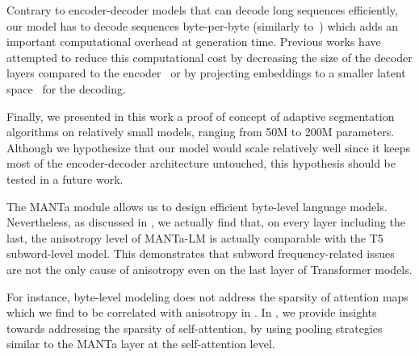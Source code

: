 Contrary to encoder-decoder models that can decode long sequences efficiently, our model has to decode sequences byte-per-byte (similarly to~\citet{clark2022canine,xue2022byt5,tay2021charformer}) which adds an important computational overhead at generation time. Previous works have attempted to reduce this computational cost by decreasing the size of the decoder layers compared to the encoder~\cite{xue2022byt5} or by projecting embeddings to a smaller latent space~\cite{jaegle2021perceiver} for the decoding.

Finally, we presented in this work a proof of concept of adaptive segmentation algorithms on relatively small models, ranging from 50M to 200M parameters. Although we hypothesize that our model would scale relatively well since it keeps most of the encoder-decoder architecture untouched, this hypothesis should be tested in a future work.


\vspace{2em}

The MANTa module allows us to design efficient byte-level language models. Nevertheless, as discussed in , we actually find that, on every layer including the last, the anisotropy level of MANTa-LM is actually comparable with the T5 subword-level model. This demonstrates that subword frequency-related issues are not the only cause of anisotropy even on the last layer of Transformer models. 

For instance, byte-level modeling does not address the sparsity of attention maps which we find to be correlated with anisotropy in . In , we provide insights towards addressing the sparsity of self-attention, by using pooling strategies similar to the MANTa layer at the self-attention level.


